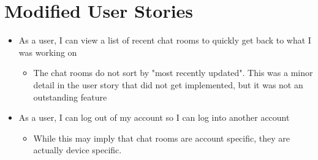 \documentclass{report}
\begin{document}
\section{Modified User Stories}
\begin{itemize}
    \item As a user, I can view a list of recent chat rooms to quickly get back to what I was working on \begin{itemize}
        \item The chat rooms do not sort by "most recently updated". This was a minor detail in the user story that did not get implemented, but it was not an outstanding feature
    \end{itemize}
    \item As a user, I can log out of my account so I can log into another account\begin{itemize}
        \item While this may imply that chat rooms are account specific, they are actually device specific.
    \end{itemize}
\end{itemize}
\end{document}
